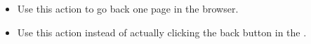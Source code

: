 
\begin{itemize}
\item Use this action to go back one page in the browser.
\item Use this action instead of actually clicking the back button in the \gdaut{}. 
\end{itemize}
